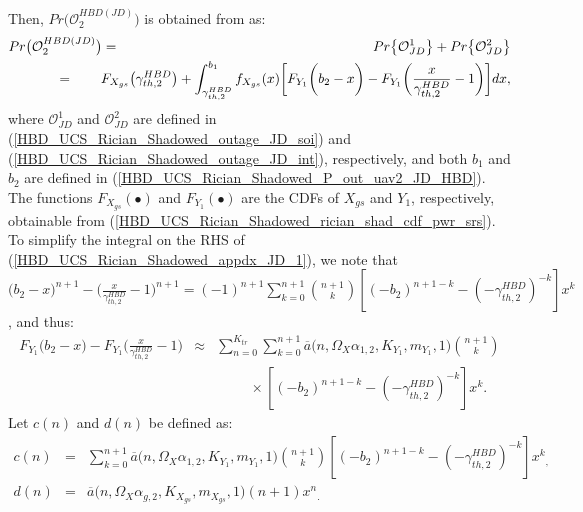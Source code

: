 Then, $Pr\big(\mathcal{O}_{2}^{HBD(JD)}\big)$ is obtained from \cite[eq. (17)]{narasimhan2007individual} as:
\begin{eqnarray}
Pr\big(\mathcal{O}_{2}^{HBD(JD)}\big) & = & Pr\big\{ \mathcal{O}_{JD}^{1} \big\} + Pr\big\{ \mathcal{O}_{JD}^{2}\big\} \nonumber\\
	& \hspace{-1.2cm} = & \hspace{-0.75cm} F_{X_{gs}}\big(\gamma_{th,2}^{HBD}\big) + \int_{\gamma_{th,2}^{HBD}}^{b_1} f_{X_{gs}}(x)\bigg[ F_{Y_1}\bigg(b_2 - x\bigg) - F_{Y_1}\bigg(\frac{x}{\gamma_{th,2}^{HBD}}-1\bigg) \bigg] dx, \label{HBD_UCS_Rician_Shadowed_appdx_JD_1}
\end{eqnarray}
where $\mathcal{O}_{JD}^{1}$ and $\mathcal{O}_{JD}^{2}$ are defined in (\ref{HBD_UCS_Rician_Shadowed_outage_JD_soi}) and (\ref{HBD_UCS_Rician_Shadowed_outage_JD_int}), respectively, and both $b_1$ and $b_2$ are defined in (\ref{HBD_UCS_Rician_Shadowed_P_out_uav2_JD_HBD}). The functions $F_{X_{gs}}(\bullet)$ and $F_{Y_1}(\bullet)$ are the CDFs of $X_{gs}$ and $Y_1$, respectively, obtainable from (\ref{HBD_UCS_Rician_Shadowed_rician_shad_cdf_pwr_srs}). To simplify the integral on the RHS of (\ref{HBD_UCS_Rician_Shadowed_appdx_JD_1}), we note that $\big(b_2 - x\big)^{n+1} - \Big(\frac{x}{\gamma_{th,2}^{HBD}}-1\Big)^{n+1} = (-1)^{n+1} \sum_{k=0}^{n+1} \binom{n+1}{k}[(-b_2)^{n+1-k}-(-\gamma_{th,2}^{HBD})^{-k}]x^k$, and thus:
\begin{eqnarray}
F_{Y_1}\big(b_2 - x\big) - F_{Y_1}\bigg(\frac{x}{\gamma_{th,2}^{HBD}}-1\bigg) & \approx & \sum_{n=0}^{K_{tr}}\sum_{k=0}^{n+1} \overline{a}\big(n,\Omega_X\alpha_{1,2},K_{Y_1},m_{Y_1},1\big) \binom{n+1}{k} \nonumber\\
 & & \hspace{1cm} \times [(-b_2)^{n+1-k}-(-\gamma_{th,2}^{HBD})^{-k}]x^k. \label{HBD_UCS_Rician_Shadowed_appdx_JD_2}
\end{eqnarray}
\newpage 
Let $c(n)$ and $d(n)$ be defined as:
\begin{eqnarray} 
c(n) & = &\sum_{k=0}^{n+1} \overline{a}\big(n,\Omega_X\alpha_{1,2},K_{Y_1},m_{Y_1},1\big) \binom{n+1}{k} [(-b_2)^{n+1-k}-(-\gamma_{th,2}^{HBD})^{-k}]{x^k}_, \\
d(n) & = & \overline{a}\big(n,\Omega_X\alpha_{g,2},K_{X_{gs}},m_{X_{gs}},1\big)(n+1) {x^n}_. 
\end{eqnarray}
